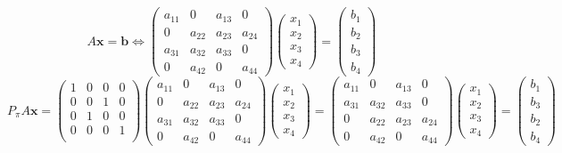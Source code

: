 \documentclass[UTF8,nofonts]{ctexart}
\begin{document}
\begin{equation}
\label{eq:axb}
A\boldsymbol{x}=\boldsymbol{b} \Longleftrightarrow
\begin{pmatrix}
a_{11} & 0 & a_{13} & 0 \\
0 & a_{22} & a_{23} & a_{24} \\
a_{31} & a_{32} & a_{33} & 0 \\
0 & a_{42} & 0 & a_{44}
\end{pmatrix}
\begin{pmatrix}x_1 \\ x_2 \\ x_3 \\ x_4\end{pmatrix}=
\begin{pmatrix}b_1 \\ b_2 \\ b_3 \\ b_4\end{pmatrix}
\end{equation}
\begin{equation*}
P_\pi A\boldsymbol{x}=
\begin{pmatrix}
1 & 0 & 0 & 0 \\
0 & 0 & 1 & 0 \\
0 & 1 & 0 & 0 \\
0 & 0 & 0 & 1 \\
\end{pmatrix}
\begin{pmatrix}
a_{11} & 0 & a_{13} & 0 \\
0 & a_{22} & a_{23} & a_{24} \\
a_{31} & a_{32} & a_{33} & 0 \\
0 & a_{42} & 0 & a_{44}
\end{pmatrix}
\begin{pmatrix}x_1 \\ x_2 \\ x_3 \\ x_4\end{pmatrix}=
\begin{pmatrix}
a_{11} & 0 & a_{13} & 0 \\
a_{31} & a_{32} & a_{33} & 0 \\
0 & a_{22} & a_{23} & a_{24} \\
0 & a_{42} & 0 & a_{44}
\end{pmatrix}
\begin{pmatrix}x_1 \\ x_2 \\ x_3 \\ x_4\end{pmatrix}=
\begin{pmatrix}b_1 \\ b_3 \\ b_2 \\ b_4\end{pmatrix}
\end{equation*}
\end{document}
